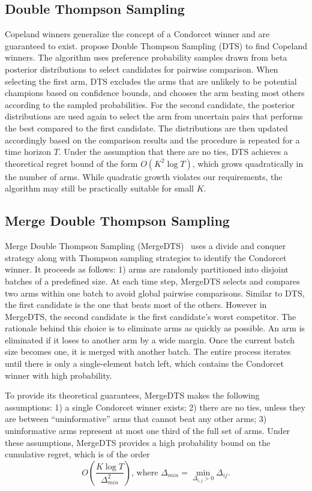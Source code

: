 \subsection{Double Thompson Sampling}

Copeland winners generalize the concept of a Condorcet winner and are guaranteed to exist. \citet{dts} propose Double Thompson Sampling (DTS) to find Copeland winners. The algorithm uses preference probability samples drawn from beta posterior distributions to select candidates for pairwise comparison. When selecting the first arm, DTS excludes the arms that are unlikely to be potential champions based on confidence bounds, and chooses the arm beating most others according to the sampled probabilities. For the second candidate, the posterior distributions are used again to select the arm from uncertain pairs that performs the best compared to the first candidate. The distributions are then updated accordingly based on the comparison results and the procedure is repeated for a time horizon $T$. Under the assumption that there are no ties, DTS achieves a theoretical regret bound of the form $O(K^2 \log T)$, which grows quadratically in the number of arms. While quadratic growth violates our requirements, the algorithm may still be practically suitable for small $K$.

\subsection{Merge Double Thompson Sampling}

Merge Double Thompson Sampling (MergeDTS)~\cite{mergedts} uses a divide and conquer strategy along with Thompson sampling strategies to identify the Condorcet winner. It proceeds as follows: 1) arms are randomly partitioned into disjoint batches of a predefined size. At each time step, MergeDTS selects and compares two arms within one batch to avoid global pairwise comparisons. Similar to DTS, the first candidate is the one that beats most of the others. However in MergeDTS, the second candidate is the first candidate's worst competitor. The rationale behind this choice is to eliminate arms as quickly as possible. An arm is eliminated if it loses to another arm by a wide margin. Once the current batch size becomes one, it is merged with another batch. The entire process iterates until there is only a single-element batch left, which contains the Condorcet winner with high probability.

To provide its theoretical guarantees, MergeDTS makes the following assumptions: 1) a single Condorcet winner exists; 2) there are no ties, unless they are between ``uninformative'' arms that cannot beat any other arms; 3) uninformative arms represent at most one third of the full set of arms. Under these assumptions, MergeDTS provides a high probability bound on the cumulative regret, which is of the order
\[
O\left(\frac{K\log T}{\Delta_{min}^2} \right)
\mbox{,\ where\ } \Delta_{min} = \min\limits_{\Delta_{i,j} > 0} \Delta_{ij}.
\]
